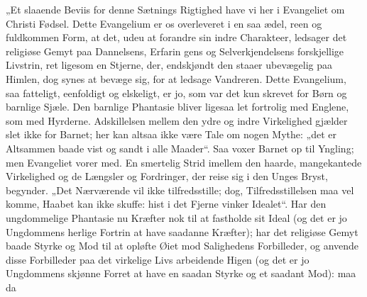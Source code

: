 \documentclass[12pt,a4paper]{book}
\begin{document}
„Et slaaende Beviis for denne Sætnings Rigtighed have vi her i Evangeliet om Christi
Fødsel. Dette Evangelium er os overleveret i en saa ædel, reen og fuldkommen Form, at
det, udeu at forandre sin indre Charakteer, ledsager det religiøse Gemyt paa Dannelsens,
Erfarin\-%
gens og Selverkjendelsens forskjellige Livstrin, ret ligesom en Stjerne, der, endskjøndt
den staaer ubevægelig paa Himlen, dog synes at bevæge sig, for at ledsage Vandreren.
Dette Evangelium, saa fatteligt, eenfoldigt og elskeligt, er jo, som var det kun skrevet
for Børn og barnlige Sjæle. Den barnlige Phantasie bliver ligesaa let fortrolig med
Englene, som med Hyrderne. Adskillelsen mellem den ydre og indre Virkelighed gjælder
slet ikke for Barnet; her kan altsaa ikke være Tale om nogen Mythe: „det er Altsammen
baade vist og sandt i alle Maader“. Saa voxer Barnet op til Yngling; men Evangeliet
vorer med. En smertelig Strid imellem den haarde, mangekantede Virkelighed og de
Længsler og Fordringer, der reise sig i den Unges Bryst, begynder. „Det Nærværende vil
ikke tilfredsstille; dog, Tilfredsstillelsen maa vel komme, Haabet kan ikke skuffe: hist
i det Fjerne vinker Idealet“. Har den ungdommelige Phantasie nu Kræfter nok til at
fastholde sit Ideal (og det er jo Ungdommens herlige Fortrin at have saadanne Kræfter);
har det religiøse Gemyt baade Styrke og Mod til at opløfte Øiet mod Salighedens
Forbilleder, og anvende disse Forbilleder paa det virkelige Livs arbeidende Higen (og
det er jo Ungdommens skjønne Forret at have en saadan Styrke og et saadant Mod): maa da
\end{document}
